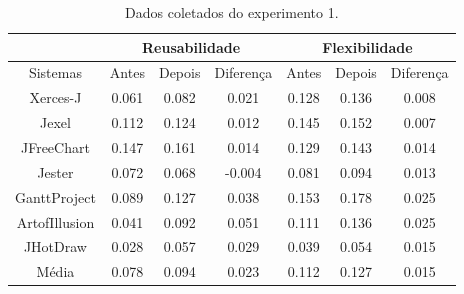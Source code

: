 \begin{table}[h]
\centering
\caption{Dados coletados do experimento 1.}
\label{tab:dados_coletados_experimento_1}
\begin{tabular}{c|l|l|l|l|l|l|}
\cline{2-7}
\multicolumn{1}{l|}{}               & \multicolumn{3}{c|}{Reusabilidade}             & \multicolumn{3}{c|}{Flexibilidade} \\ \hline
\multicolumn{1}{|c|}{Sistemas}      & Antes         & Depois        & Diferença      & Antes     & Depois    & Diferença  \\ \hline
\multicolumn{1}{|c|}{Xerces-J}      & \multicolumn{1}{c|}{0.061}          & \multicolumn{1}{c|}{0.082}          & \multicolumn{1}{c|}{0.021} & \multicolumn{1}{c|}{0.128}      & \multicolumn{1}{c|}{0.136}      &\multicolumn{1}{c|}{0.008}\\ \hline
\multicolumn{1}{|c|}{Jexel}         & \multicolumn{1}{c|}{0.112}& \multicolumn{1}{c|}{0.124} & \multicolumn{1}{c|}{0.012} & \multicolumn{1}{c|}{0.145}      & \multicolumn{1}{c|}{0.152}      &\multicolumn{1}{c|}{0.007}\\ \hline
\multicolumn{1}{|c|}{JFreeChart}    & \multicolumn{1}{c|}{0.147}& \multicolumn{1}{c|}{0.161}& \multicolumn{1}{c|}{0.014} & \multicolumn{1}{c|}{0.129}      & \multicolumn{1}{c|}{0.143}      & \multicolumn{1}{c|}{0.014} \\ \hline
\multicolumn{1}{|c|}{Jester}        & \multicolumn{1}{c|}{0.072}& \multicolumn{1}{c|}{0.068}& \multicolumn{1}{c|}{-0.004} & \multicolumn{1}{c|}{0.081}      & \multicolumn{1}{c|}{0.094}      & \multicolumn{1}{c|}{0.013}  \\ \hline
\multicolumn{1}{|c|}{GanttProject}  & \multicolumn{1}{c|}{0.089}& \multicolumn{1}{c|}{0.127}          & \multicolumn{1}{c|}{0.038} & \multicolumn{1}{c|}{0.153}      & \multicolumn{1}{c|}{0.178}      &  \multicolumn{1}{c|}{0.025} \\ \hline
\multicolumn{1}{|c|}{ArtofIllusion} & \multicolumn{1}{c|}{0.041}          & \multicolumn{1}{c|}{0.092}          & \multicolumn{1}{c|}{0.051} & \multicolumn{1}{c|}{0.111}      & \multicolumn{1}{c|}{0.136}      & \multicolumn{1}{c|}{0.025} \\ \hline
\multicolumn{1}{|c|}{JHotDraw}      & \multicolumn{1}{c|}{0.028}          & \multicolumn{1}{c|}{0.057}          & \multicolumn{1}{c|}{0.029} & \multicolumn{1}{c|}{0.039}      & \multicolumn{1}{c|}{0.054}      & \multicolumn{1}{c|}{0.015}\\ \hline
\multicolumn{1}{|c|}{Média}         & \multicolumn{1}{c|}{0.078}         & \multicolumn{1}{c|}{0.094}         & \multicolumn{1}{c|}{0.023} & \multicolumn{1}{c|}{0.112}     & \multicolumn{1}{c|}{0.127}     & \multicolumn{1}{c|}{0.015} \\ \hline

\end{tabular}
\end{table}
